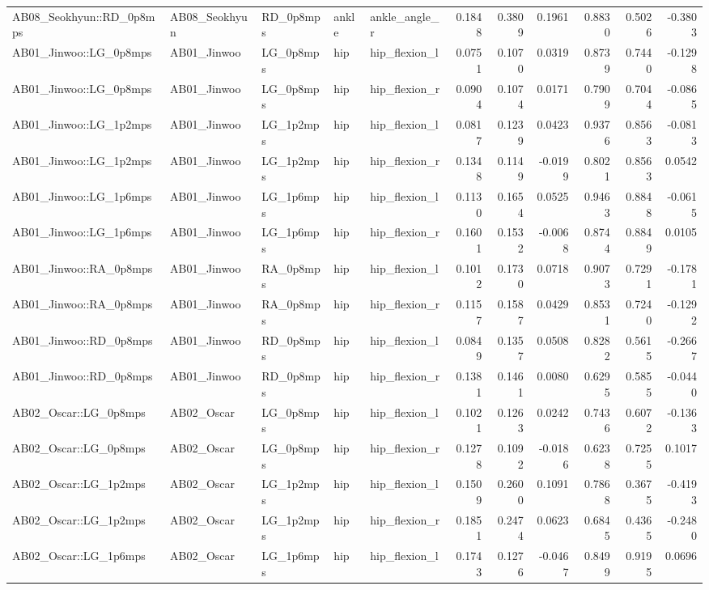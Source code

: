 \begin{table}
\begin{tabular}{lllllrrrrrr}
AB08_Seokhyun::RD_0p8mps & AB08_Seokhyun & RD_0p8mps & ankle & ankle_angle_r & 0.1848 & 0.3809 & 0.1961 & 0.8830 & 0.5026 & -0.3803 \\
AB01_Jinwoo::LG_0p8mps & AB01_Jinwoo & LG_0p8mps & hip & hip_flexion_l & 0.0751 & 0.1070 & 0.0319 & 0.8739 & 0.7440 & -0.1298 \\
AB01_Jinwoo::LG_0p8mps & AB01_Jinwoo & LG_0p8mps & hip & hip_flexion_r & 0.0904 & 0.1074 & 0.0171 & 0.7909 & 0.7044 & -0.0865 \\
AB01_Jinwoo::LG_1p2mps & AB01_Jinwoo & LG_1p2mps & hip & hip_flexion_l & 0.0817 & 0.1239 & 0.0423 & 0.9376 & 0.8563 & -0.0813 \\
AB01_Jinwoo::LG_1p2mps & AB01_Jinwoo & LG_1p2mps & hip & hip_flexion_r & 0.1348 & 0.1149 & -0.0199 & 0.8021 & 0.8563 & 0.0542 \\
AB01_Jinwoo::LG_1p6mps & AB01_Jinwoo & LG_1p6mps & hip & hip_flexion_l & 0.1130 & 0.1654 & 0.0525 & 0.9463 & 0.8848 & -0.0615 \\
AB01_Jinwoo::LG_1p6mps & AB01_Jinwoo & LG_1p6mps & hip & hip_flexion_r & 0.1601 & 0.1532 & -0.0068 & 0.8744 & 0.8849 & 0.0105 \\
AB01_Jinwoo::RA_0p8mps & AB01_Jinwoo & RA_0p8mps & hip & hip_flexion_l & 0.1012 & 0.1730 & 0.0718 & 0.9073 & 0.7291 & -0.1781 \\
AB01_Jinwoo::RA_0p8mps & AB01_Jinwoo & RA_0p8mps & hip & hip_flexion_r & 0.1157 & 0.1587 & 0.0429 & 0.8531 & 0.7240 & -0.1292 \\
AB01_Jinwoo::RD_0p8mps & AB01_Jinwoo & RD_0p8mps & hip & hip_flexion_l & 0.0849 & 0.1357 & 0.0508 & 0.8282 & 0.5615 & -0.2667 \\
AB01_Jinwoo::RD_0p8mps & AB01_Jinwoo & RD_0p8mps & hip & hip_flexion_r & 0.1381 & 0.1461 & 0.0080 & 0.6295 & 0.5855 & -0.0440 \\
AB02_Oscar::LG_0p8mps & AB02_Oscar & LG_0p8mps & hip & hip_flexion_l & 0.1021 & 0.1263 & 0.0242 & 0.7436 & 0.6072 & -0.1363 \\
AB02_Oscar::LG_0p8mps & AB02_Oscar & LG_0p8mps & hip & hip_flexion_r & 0.1278 & 0.1092 & -0.0186 & 0.6238 & 0.7255 & 0.1017 \\
AB02_Oscar::LG_1p2mps & AB02_Oscar & LG_1p2mps & hip & hip_flexion_l & 0.1509 & 0.2600 & 0.1091 & 0.7868 & 0.3675 & -0.4193 \\
AB02_Oscar::LG_1p2mps & AB02_Oscar & LG_1p2mps & hip & hip_flexion_r & 0.1851 & 0.2474 & 0.0623 & 0.6845 & 0.4365 & -0.2480 \\
AB02_Oscar::LG_1p6mps & AB02_Oscar & LG_1p6mps & hip & hip_flexion_l & 0.1743 & 0.1276 & -0.0467 & 0.8499 & 0.9195 & 0.0696 \\

\end{tabular}
\end{table}
